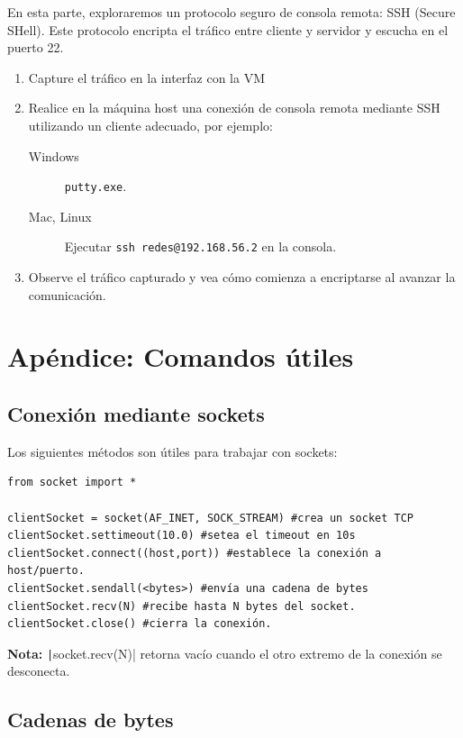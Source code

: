 \documentclass[a4paper,10pt]{article}
\begin{document}
En esta parte, exploraremos un protocolo seguro de consola remota: SSH (Secure SHell). Este protocolo encripta el tráfico entre cliente y servidor y escucha en el puerto 22.

\begin{enumerate}
    \item Capture el tráfico en la interfaz con la VM
    \item Realice en la máquina host una conexión de consola remota mediante SSH utilizando un cliente adecuado, por ejemplo:
     \begin{description}
        \item[Windows] \texttt{putty.exe}.
        \item[Mac, Linux] Ejecutar \texttt{ssh redes@192.168.56.2} en la consola.
     \end{description}
    \item Observe el tráfico capturado y vea cómo comienza a encriptarse al avanzar la comunicación.
\end{enumerate}


\appendix

\section*{Apéndice: Comandos útiles}

\subsection*{Conexión mediante sockets}

Los siguientes métodos son útiles para trabajar con sockets:
\begin{verbatim}
from socket import *

clientSocket = socket(AF_INET, SOCK_STREAM) #crea un socket TCP
clientSocket.settimeout(10.0) #setea el timeout en 10s
clientSocket.connect((host,port)) #establece la conexión a host/puerto.
clientSocket.sendall(<bytes>) #envía una cadena de bytes
clientSocket.recv(N) #recibe hasta N bytes del socket.
clientSocket.close() #cierra la conexión.
\end{verbatim}

\textbf{Nota:} \texttt|socket.recv(N)| retorna vacío cuando el otro extremo de la conexión se desconecta.
\subsection*{Cadenas de bytes}
\end{document}
